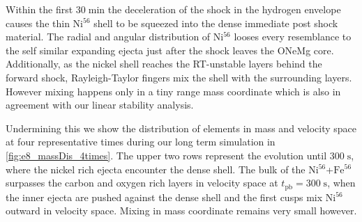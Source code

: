 \documentclass[fleqn,usenatbib]{mnras}
\newcommand{\nickel}{$\mathrm{Ni^{56}}$\xspace}
\newcommand{\iron}{$\mathrm{Fe^{56}}$\xspace}
\begin{document}
Within the first $30\;\mathrm{min}$ the deceleration of the shock in the hydrogen envelope causes the thin \nickel shell to be squeezed into the dense immediate post shock material. The radial and angular distribution of \nickel looses every resemblance to the self similar expanding ejecta just after the shock leaves the ONeMg core.
Additionally, as the nickel shell reaches the RT-unstable layers behind the forward shock, Rayleigh-Taylor fingers mix the shell with the surrounding layers. However mixing happens only in a tiny range mass coordinate which is also in agreement with our linear stability analysis.

Undermining this we show the distribution of elements in mass and velocity space at four representative times during our long term simulation in \autoref{fig:e8_massDis_4times}. The upper two rows represent the evolution until $300\;\mathrm{s}$, where the nickel rich ejecta encounter the dense shell.
The bulk of the \nickel+\iron surpasses the carbon and oxygen rich layers in velocity space at $t_{\mathrm{pb}}=300\;\mathrm{s}$, when the inner ejecta are pushed against the dense shell and the first cusps mix \nickel outward in velocity space. Mixing in mass coordinate remains very small however.
\end{document}
